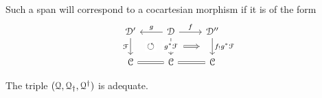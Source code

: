 \documentclass[main.tex]{subfiles}
\begin{document}
Such a span will correspond to a cocartesian morphism if it is of the form
\begin{equation*}
  \begin{tikzcd}
    \category{D}'
    \arrow[d, "\mathcal{F}"{left}, ""{name=L, right}]
    & \category{D}
    \arrow[d, "g^{*}\mathcal{F}"{description}, ""{name=ML, left}, ""{name=MR, right}]
    \arrow[l, swap, "g"]
    \arrow[r, "f"]
    & \category{D}''
    \arrow[d, ""{name=R, left}, "f_{!}g^{*}\mathcal{F}"{right}]
    \\
    \category{C}
    \arrow[r, equals]
    &\category{C}
    & \category{C}
    \arrow[l, equals]
    \arrow[Rightarrow, from=MR, to=R, shorten=2ex]
    \arrow[Rightarrow, from=ML, to=L, phantom, "\circlearrowleft"{description}]
  \end{tikzcd}
\end{equation*}

\begin{proposition}
  \label{prop:q_triple_is_adequate}
  The triple $(\mathcal{Q}, \mathcal{Q}_{\dagger}, \mathcal{Q}^{\dagger})$ is adequate.
\end{proposition}
\end{document}
